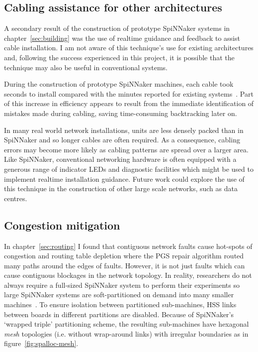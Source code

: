 		\subsection{Cabling assistance for other architectures}
			
			A secondary result of the construction of prototype SpiNNaker systems in
			chapter~\ref{sec:building} was the use of realtime guidance and feedback
			to assist cable installation. I am not aware of this technique's use for
			existing architectures and, following the success experienced in this
			project, it is possible that the technique may also be useful in
			conventional systems.
			
			During the construction of prototype SpiNNaker machines, each cable took
			seconds to install compared with the minutes reported for existing
			systems~\cite{mudigonda11}. Part of this increase in efficiency appears
			to result from the immediate identification of mistakes made during
			cabling, saving time-consuming backtracking later on.
			
			In many real world network installations, units are less densely packed
			than in SpiNNaker and so longer cables are often required. As a
			consequence, cabling errors may become more likely as cabling patterns
			are spread over a larger area. Like SpiNNaker, conventional networking
			hardware is often equipped with a generous range of indicator LEDs and
			diagnostic facilities which might be used to implement realtime
			installation guidance. Future work could explore the use of this
			technique in the construction of other large scale networks, such as data
			centres.
		
		\subsection{Congestion mitigation}
			
			\label{sec:wiggly-board-allocations}
			
			In chapter~\ref{sec:routing} I found that contiguous network faults cause
			hot-spots of congestion and routing table depletion where the PGS repair
			algorithm routed many paths around the edges of faults.  However, it is
			not just faults which can cause contiguous blockages in the network
			topology. In reality, researchers do not always require a full-sized
			SpiNNaker system to perform their experiments so large SpiNNaker systems
			are soft-partitioned on demand into many smaller
			machines~\cite{spalloc16}. To ensure isolation between partitioned
			sub-machines, HSS links between boards in different partitions are
			disabled. Because of SpiNNaker's `wrapped triple' partitioning scheme,
			the resulting sub-machines have hexagonal \emph{mesh} topologies (i.e.
			without wrap-around links) with irregular boundaries as in
			figure~\ref{fig:spalloc-mesh}.
			
